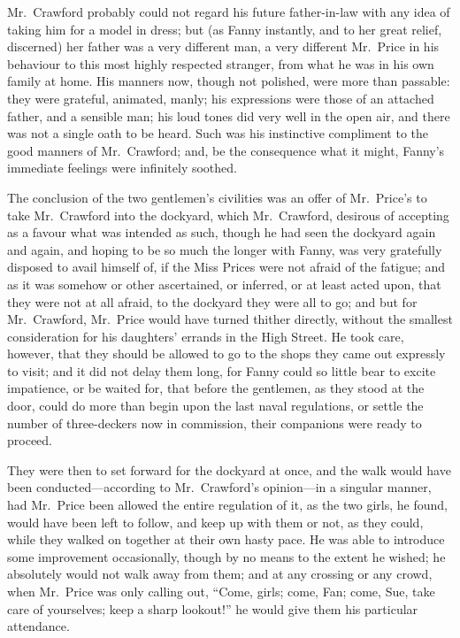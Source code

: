 Mr.\ Crawford probably could not regard his future
father-in-law with any idea of taking him for a model
in dress; but (as Fanny instantly, and to her great
relief, discerned) her father was a very different man,
a very different Mr.\ Price in his behaviour to this most
highly respected stranger, from what he was in his own
family at home.  His manners now, though not polished,
were more than passable:  they were grateful, animated, manly;
his expressions were those of an attached father,
and a sensible man; his loud tones did very well in the
open air, and there was not a single oath to be heard.
Such was his instinctive compliment to the good manners
of Mr.\ Crawford; and, be the consequence what it might,
Fanny's immediate feelings were infinitely soothed.

The conclusion of the two gentlemen's civilities was an offer
of Mr.\ Price's to take Mr.\ Crawford into the dockyard,
which Mr.\ Crawford, desirous of accepting as a favour
what was intended as such, though he had seen the dockyard
again and again, and hoping to be so much the longer
with Fanny, was very gratefully disposed to avail himself of,
if the Miss Prices were not afraid of the fatigue;
and as it was somehow or other ascertained, or inferred,
or at least acted upon, that they were not at all afraid,
to the dockyard they were all to go; and but for
Mr.\ Crawford, Mr.\ Price would have turned thither directly,
without the smallest consideration for his daughters'
errands in the High Street.  He took care, however, that they
should be allowed to go to the shops they came out expressly
to visit; and it did not delay them long, for Fanny could
so little bear to excite impatience, or be waited for,
that before the gentlemen, as they stood at the door,
could do more than begin upon the last naval regulations,
or settle the number of three-deckers now in commission,
their companions were ready to proceed.

They were then to set forward for the dockyard at once,
and the walk would have been conducted---according to
Mr.\ Crawford's opinion---in a singular manner,
had Mr.\ Price been allowed the entire regulation of it,
as the two girls, he found, would have been left
to follow, and keep up with them or not, as they could,
while they walked on together at their own hasty pace.
He was able to introduce some improvement occasionally,
though by no means to the extent he wished; he absolutely
would not walk away from them; and at any crossing
or any crowd, when Mr.\ Price was only calling out,
``Come, girls; come, Fan; come, Sue, take care of yourselves;
keep a sharp lookout!'' he would give them his particular
attendance.

